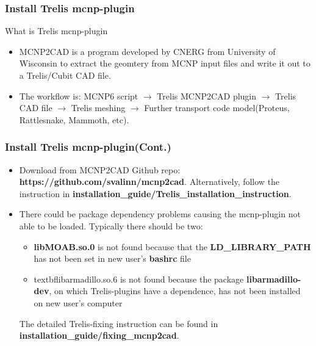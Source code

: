 \documentclass[fleqn]{beamer}
\begin{document}
\begin{frame}
\frametitle{Install Trelis mcnp-plugin}
\begin{block}{What is Trelis mcnp-plugin}
\begin{itemize}
 \item MCNP2CAD  is a program developed by CNERG from University of Wisconsin to extract the geomtery from MCNP input files and write it out
to a Trelis/Cubit CAD file.
 \item The workflow is: MCNP6 script $\rightarrow$ Trelis MCNP2CAD plugin $\rightarrow$ Trelis CAD file $\rightarrow$ Trelis meshing $\rightarrow$ Further transport code model(Proteus, Rattlesnake, Mammoth, etc). 
\end{itemize}
\end{block}
\end{frame}

\begin{frame}
\frametitle{Install Trelis mcnp-plugin(Cont.)}
\begin{itemize}
\item Download from MCNP2CAD Github repo: \textbf{https://github.com/svalinn/mcnp2cad}. Alternatively, follow the instruction in \textbf{installation\_guide/Trelis\_installation\_instruction}.
 \item There could be package dependency problems causing the mcnp-plugin not able to be loaded. Typically there should be two:
 \begin{itemize}
  \item  \textbf{libMOAB.so.0} is not found because that the \textbf{LD\_LIBRARY\_PATH} has not been set in new user's \textbf{bashrc} file
  \item textbf{libarmadillo.so.6} is not found because the package \textbf{libarmadillo-dev}, on which Trelis-plugins have a dependence, has not been
   installed on new user's computer
 \end{itemize}

The detailed Trelis-fixing instruction can be found in \textbf{installation\_guide/fixing\_mcnp2cad}.
\end{itemize}
\end{frame}
\end{document}
